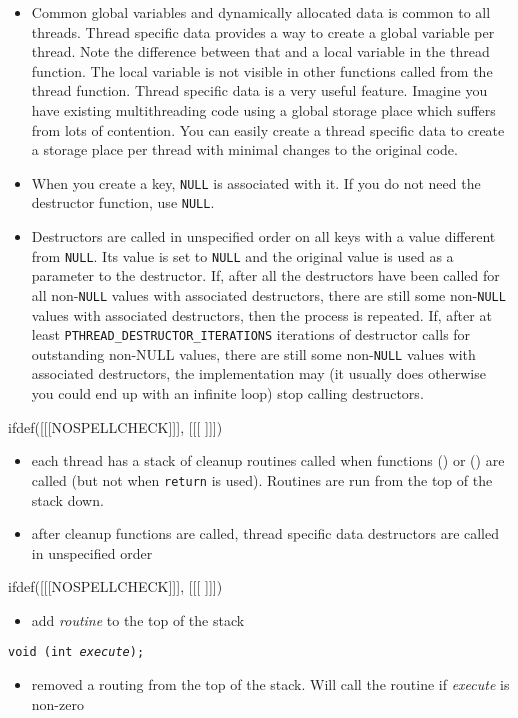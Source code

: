 \begin{itemize}
\item \label{THREAD_SPECIFIC_DATA} Common global variables and dynamically
allocated data is common to all threads.  Thread specific data provides a way to
create a global variable per thread.  Note the difference between that and a
local variable in the thread function.  The local variable is not visible in
other functions called from the thread function.  Thread specific data is a very
useful feature.  Imagine you have existing multithreading code using a global
storage place which suffers from lots of contention.  You can easily create a
thread specific data to create a storage place per thread with minimal changes
to the original code.
\item When you create a key, \texttt{NULL} is associated with it.  If you do not
need the destructor function, use \texttt{NULL}.
\item Destructors are called in unspecified order on all keys with a value
different from \texttt{NULL}.  Its value is set to \texttt{NULL} and the
original value is used as a parameter to the destructor.  If, after all the
destructors have been called for all non-\texttt{NULL} values with associated
destructors, there are still some non-\texttt{NULL} values with associated
destructors, then the process is repeated.  If, after at least
\texttt{PTHREAD\_DESTRUCTOR\_ITERATIONS} iterations of destructor calls for
outstanding non-NULL values, there are still some non-\texttt{NULL} values with
associated destructors, the implementation may (it usually does otherwise you
could end up with an infinite loop) stop calling destructors.
\end{itemize}


ifdef([[[NOSPELLCHECK]]], [[[
]]])

\begin{slide}
\begin{itemize}
\item each thread has a stack of cleanup routines called when functions
() or () are called (but not when
\texttt{return} is used).  Routines are run from the top of the stack down.
\item after cleanup functions are called, thread specific data destructors are
called in unspecified order
\end{itemize}
ifdef([[[NOSPELLCHECK]]], [[[
]]])
\begin{itemize}
\item add \emph{routine} to the top of the stack
\end{itemize}
\texttt{void (int \emph{execute});}
\begin{itemize}
\item removed a routing from the top of the stack.  Will call the routine if
\emph{execute} is non-zero
\end{itemize}
\end{slide}

